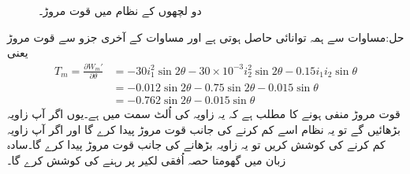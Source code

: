 \begin{figure}
\caption{دو لچھوں کے نظام میں قوت مروڑ۔}
\label{شکل_تبادلہ_توانائی_دو_لچھوں_میں_مروڑ}
\end{figure}

حل:مساوات  سے ہمہ توانائی حاصل ہوتی ہے اور مساوات   کے آخری جزو سے قوت مروڑ یعنی
\begin{align*}
T_m=\frac{\partial W_m'}{\partial \theta}&=-30 i_1^2 \sin 2 \theta-30\times 10^{-3} i_2^2 \sin 2 \theta -0.15 i_1 i_2 \sin \theta\\
&=-0.012 \sin 2 \theta-0.75 \sin 2 \theta-0.015 \sin \theta\\
&=-0.762 \sin 2 \theta-0.015 \sin \theta
\end{align*}
قوت مروڑ منفی ہونے کا مطلب ہے کہ یہ زاویہ کی اُلٹ سمت میں ہے۔یوں اگر آپ زاویہ بڑھائیں گے تو یہ نظام اسے کم کرنے کی جانب قوت مروڑ پیدا کرے گا اور اگر آپ زاویہ کم کرنے کی کوشش کریں تو یہ زاویہ بڑھانے کی جانب قوت مروڑ پیدا کرے گا۔سادہ زبان میں گھومتا حصہ اُفقی لکیر پر رہنے کی کوشش کرے گا۔
